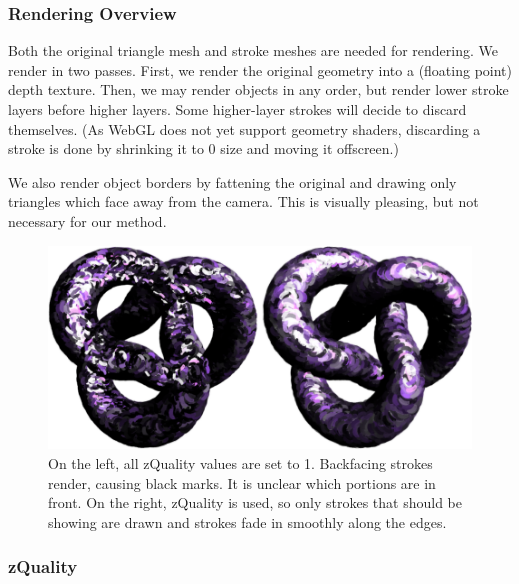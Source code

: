 \documentclass[conference]{acmsiggraph}
\begin{document}
\subsubsection{Rendering Overview}

Both the original triangle mesh and stroke meshes are needed for rendering. We
render in two passes. First, we render the original geometry into a (floating
point) depth texture. Then, we may render objects in any order, but render
lower stroke layers before higher layers. Some higher-layer strokes will decide
to discard themselves. (As WebGL does not yet support geometry shaders,
discarding a stroke is done by shrinking it to 0 size and moving it offscreen.)

We also render object borders by fattening the original and drawing only
triangles which face away from the camera. This is visually pleasing, but not
necessary for our method.

\begin{figure}[t] %
  \centering
  \includegraphics[width=5.0in]{images/torus_depth_test_demo}
  \caption{On the left, all zQuality values are set to 1. Backfacing strokes
           render, causing black marks. It is unclear which portions are in
           front. On the right, zQuality is used, so only strokes that should
           be showing are drawn and strokes fade in smoothly along the edges.}
\end{figure}

\subsubsection{zQuality}



\end{document}
